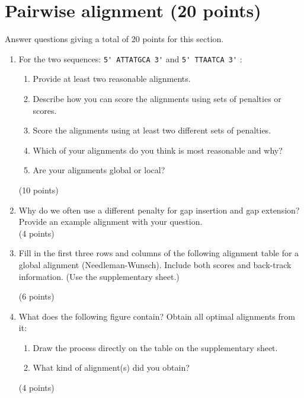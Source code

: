 \documentclass[11pt]{article}
\begin{document}
\section{Pairwise alignment (20 points)}
Answer questions giving a total of 20 points for this section.
\begin{enumerate}
\item For the two sequences: \verb|5' ATTATGCA 3'| and \verb|5' TTAATCA 3'| :
  \begin{enumerate}
    \item Provide at least two reasonable alignments.
    \item Describe how you can score the alignments using sets of penalties
      or scores.
    \item Score the alignments using at least two different sets of
      penalties. 
    \item Which of your alignments do you think is most reasonable and why? 
    \item Are your alignments global or local?
  \end{enumerate}
  (10 points)

\item Why do we often use a different penalty for gap insertion and gap
  extension? Provide an example alignment with your question.\\
  (4 points)

\item Fill in the first three rows and columns of the following
  alignment table for a global alignment (Needleman-Wunsch). Include
  both scores and back-track information. (Use the supplementary sheet.)
  \begin{figure}[H]
    \begin{tikzpicture}[scale=0.6]
      
    \end{tikzpicture}
  \end{figure}
  (6 points)

\item What does the following figure contain?
  Obtain all optimal alignments from it:
  \begin{figure}[H]
    \begin{tikzpicture}[scale=0.6]
      
    \end{tikzpicture}
  \end{figure}
  \begin{enumerate}
  \item Draw the process directly on the table on the supplementary sheet.
  \item What kind of alignment(s) did you obtain?
  \end{enumerate}
  (4 points)


\end{enumerate}
\end{document}
